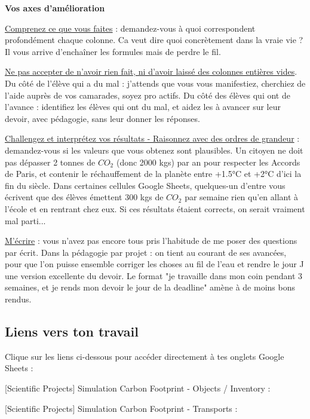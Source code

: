 \documentclass[answers]{exam}
\newcommand{\varLinkObjects}{}
\newcommand{\varLinkDistances}{}
\newcommand{\varLinkTransport}{}
\begin{document}
\begin{tcolorbox}[
  enhanced,
  colback=myindbg,
  colframe=myindfr,
  title=Feedback général - Destiné à l'ensemble de la classe,
  arc=4mm,
  boxsep=4pt,
  boxrule=0.6mm,
]
\textbf{Vos axes d'amélioration}
\begin{compactitem}
    \item \underline{Comprenez ce que vous faites} : demandez-vous à quoi correspondent profondément chaque colonne. Ca veut dire quoi concrètement dans la vraie vie ? Il vous arrive d'enchaîner les formules mais de perdre le fil.
    \item \underline{Ne pas accepter de n'avoir rien fait, ni d'avoir laissé des colonnes entières vides}. Du côté de l'élève qui a du mal : j'attends que vous vous manifestiez, cherchiez de l'aide auprès de vos camarades, soyez pro actifs. Du côté des élèves qui ont de l'avance : identifiez les élèves qui ont du mal, et aidez les à avancer sur leur devoir, avec pédagogie, sans leur donner les réponses.
    \item \underline{Challengez et interprétez vos résultats - Raisonnez avec des ordres de grandeur} : demandez-vous si les valeurs que vous obtenez sont plausibles. Un citoyen ne doit pas dépasser 2 tonnes de $CO_2$ (donc 2000 kgs) par an pour respecter les Accords de Paris, et contenir le réchauffement de la planète entre +1.5°C et +2°C d'ici la fin du siècle. Dans certaines cellules Google Sheets, quelques-un d'entre vous écrivent que des élèves émettent 300 kgs de $CO_2$ par semaine rien qu'en allant à l'école et en rentrant chez eux. Si ces résultats étaient corrects, on serait vraiment mal parti...
    \item \underline{M'écrire} : vous n'avez pas encore tous pris l'habitude de me poser des questions par écrit. Dans la pédagogie par projet : on tient au courant de ses avancées, pour que l'on puisse ensemble corriger les choses au fil de l'eau et rendre le jour J une version excellente du devoir. Le format "je travaille dans mon coin pendant 3 semaines, et je rends mon devoir le jour de la deadline" amène à de moins bons rendus.
\end{compactitem}

\end{tcolorbox}

\subsection*{Liens vers ton travail}

Clique sur les liens ci-dessous pour accéder directement à tes onglets Google Sheets :

\begin{compactitem}
  \item {[}Scientific Projects{]} Simulation Carbon Footprint - Objects / Inventory : \varLinkObjects{}
  \item {[}Scientific Projects{]} Simulation Carbon Footprint - Transports :
    \begin{compactitem}
      \item \varLinkDistances{}
      \item \varLinkTransport{}
    \end{compactitem}
\end{compactitem}
\end{document}
